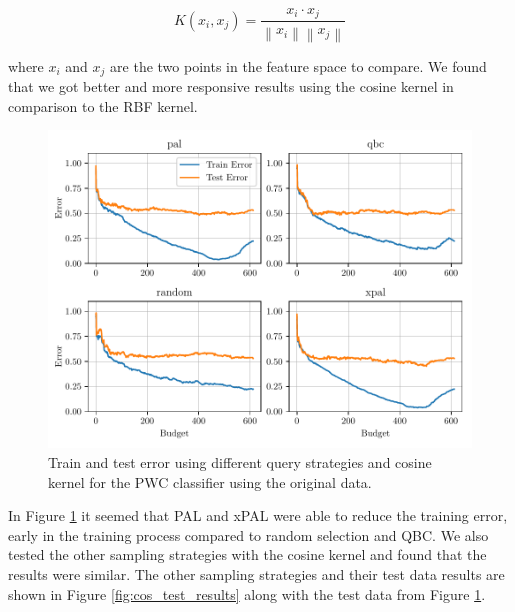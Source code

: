 \begin{equation}
    K(x_i, x_j) = \frac{x_i \cdot x_j}{\left\| x_i \right\| \left\| x_j \right\|}
\label{eq:cosine_kernel}
\end{equation}

where $x_i$ and $x_j$ are the two points in the feature space to compare. We found that we got better and more responsive results using the cosine kernel in comparison to the RBF kernel.  

\begin{figure}[ht]
  \centering
  \includegraphics[width=\textwidth]{../img/plot_all_results_cosine_original_data}
  \caption{Train and test error using different query strategies and cosine kernel for the PWC classifier using the original data.}
  \label{fig:plot_all_results_cosine}
\end{figure}


In Figure \ref{fig:plot_all_results_cosine} it seemed that PAL and xPAL were able to reduce the training error, early in the training process compared to random selection and QBC. We also tested the other sampling strategies with the cosine kernel and found that the results were similar. The other sampling strategies and their test data results are shown in Figure \ref{fig:cos_test_results} along with the test data from Figure \ref{fig:plot_all_results_cosine}. 


